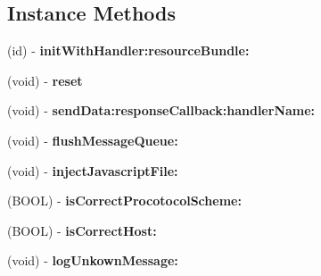 \subsection*{Instance Methods}
\begin{DoxyCompactItemize}
\item 
\mbox{\label{interface_web_view_javascript_bridge_base_a6e22c44110bdcfeb0acb6a516dd984d7}} 
(id) -\/ {\bfseries init\+With\+Handler\+:resource\+Bundle\+:}
\item 
\mbox{\label{interface_web_view_javascript_bridge_base_a65605346d9ddd5672273ee447d39af40}} 
(void) -\/ {\bfseries reset}
\item 
\mbox{\label{interface_web_view_javascript_bridge_base_a6f20f47479e89d1e987fb47ae2307df7}} 
(void) -\/ {\bfseries send\+Data\+:response\+Callback\+:handler\+Name\+:}
\item 
\mbox{\label{interface_web_view_javascript_bridge_base_ac33748255c9c029985f83042f3a6913d}} 
(void) -\/ {\bfseries flush\+Message\+Queue\+:}
\item 
\mbox{\label{interface_web_view_javascript_bridge_base_a4b1de1670f928b6badc6233faf4b4f7d}} 
(void) -\/ {\bfseries inject\+Javascript\+File\+:}
\item 
\mbox{\label{interface_web_view_javascript_bridge_base_a977c3ae598481b5ccd4317672b426575}} 
(B\+O\+OL) -\/ {\bfseries is\+Correct\+Procotocol\+Scheme\+:}
\item 
\mbox{\label{interface_web_view_javascript_bridge_base_a3e5723c87121acc316f574db2eea866c}} 
(B\+O\+OL) -\/ {\bfseries is\+Correct\+Host\+:}
\item 
\mbox{\label{interface_web_view_javascript_bridge_base_a1c5218e0de6b08070e6421d9062741b0}} 
(void) -\/ {\bfseries log\+Unkown\+Message\+:}
\item 
\mbox{\label{interface_web_view_javascript_bridge_base_a3f24b9f988ee8153237305dcc6826506}} 

\end{DoxyCompactItemize}
